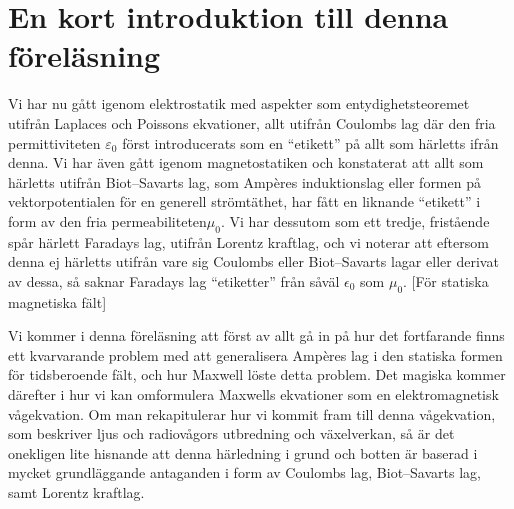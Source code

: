 {{{{{\section{En kort introduktion till denna f{\"o}rel{\"a}sning}
Vi har nu g{\aa}tt igenom elektrostatik med aspekter som entydighetsteoremet
utifr{\aa}n Laplaces och Poissons ekvationer, allt utifr{\aa}n Coulombs lag
d{\"a}r den fria permittiviteten $\varepsilon_0$ f{\"o}rst introducerats som
en ``etikett'' p{\aa} allt som h{\"a}rletts ifr{\aa}n denna.
Vi har {\"a}ven g{\aa}tt igenom magnetostatiken och konstaterat att allt som
h{\"a}rletts utifr{\aa}n Biot--Savarts lag, som Amp{\`e}res induktionslag eller
formen p{\aa} vektorpotentialen f{\"o}r en generell str{\"o}mt{\"a}thet, har
f{\aa}tt en liknande ``etikett'' i form av den fria permeabiliteten$\mu_0$.
Vi har dessutom som ett tredje, frist{\aa}ende sp{\aa}r h{\"a}rlett Faradays
lag, utifr{\aa}n Lorentz kraftlag, och vi noterar att eftersom denna ej
h{\"a}rletts utifr{\aa}n vare sig Coulombs eller Biot--Savarts lagar eller
derivat av dessa, s{\aa} saknar Faradays lag ``etiketter'' fr{\aa}n
s{\aa}v{\"a}l $\epsilon_0$ som $\mu_0$.
[F{\"o}r statiska magnetiska f{\"a}lt]

Vi kommer i denna f{\"o}rel{\"a}sning att f{\"o}rst av allt g{\aa} in p{\aa}
hur det fortfarande finns ett kvarvarande problem med att generalisera
Amp{\`e}res lag i den statiska formen f{\"o}r tidsberoende f{\"a}lt, och hur
Maxwell  l{\"o}ste detta problem.
Det magiska kommer d{\"a}refter i hur vi kan omformulera Maxwells ekvationer
 som en elektromagnetisk v{\aa}gekvation.
Om man rekapitulerar hur vi kommit fram till denna v{\aa}gekvation, som
beskriver ljus och radiov{\aa}gors utbredning och v{\"a}xelverkan, s{\aa}
{\"a}r det onekligen lite hisnande att denna h{\"a}rledning i grund och botten
{\"a}r baserad i mycket grundl{\"a}ggande antaganden i form av Coulombs lag,
Biot--Savarts lag, samt Lorentz kraftlag.
\vfill\eject

}}}}}
